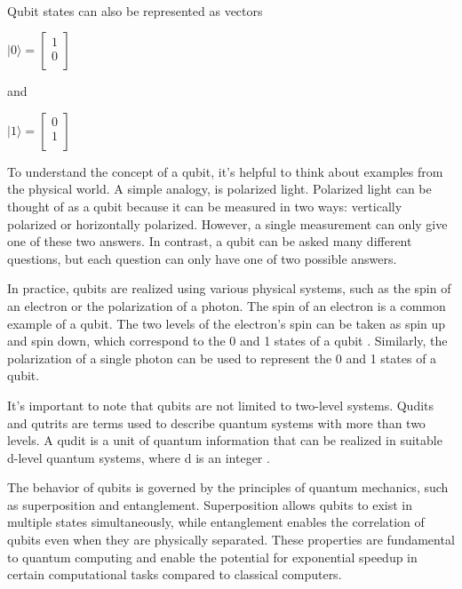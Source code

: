 \documentclass[inscr,ack,preface]{diphdthesis}
\begin{document}
 \\Qubit states can also be represented as vectors
 \begin{center}
 \Large
 $\vert0\rangle = 
    \begin{bmatrix}
    1 \\
    0 \\
    \end{bmatrix}$
\end{center}
\normalsize
and \\
\begin{center}
\Large
$\vert1\rangle = 
\begin{bmatrix}
0 \\
1 \\
\end{bmatrix}$
\end{center}
\normalsize
To understand the concept of a qubit, it's helpful to think about examples from the physical world. A simple analogy, is polarized light. Polarized light can be thought of as a qubit because it can be measured in two ways: vertically polarized or horizontally polarized. However, a single measurement can only give one of these two answers. In contrast, a qubit can be asked many different questions, but each question can only have one of two possible answers\cite{polarized}.

In practice, qubits are realized using various physical systems, such as the spin of an electron or the polarization of a photon. The spin of an electron is a common example of a qubit. The two levels of the electron's spin can be taken as spin up and spin down, which correspond to the 0 and 1 states of a qubit \cite{electron}. Similarly, the polarization of a single photon can be used to represent the 0 and 1 states of a qubit.

It's important to note that qubits are not limited to two-level systems. Qudits and qutrits are terms used to describe quantum systems with more than two levels. A qudit is a unit of quantum information that can be realized in suitable d-level quantum systems, where d is an integer \cite{qudit}.

The behavior of qubits is governed by the principles of quantum mechanics, such as superposition and entanglement. Superposition allows qubits to exist in multiple states simultaneously, while entanglement enables the correlation of qubits even when they are physically separated. These properties are fundamental to quantum computing and enable the potential for exponential speedup in certain computational tasks compared to classical computers.
\end{document}
